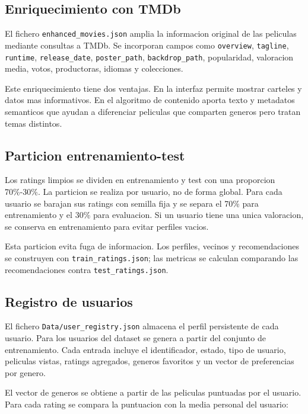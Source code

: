 \documentclass[12pt,a4paper]{article}
\begin{document}
\subsection{Enriquecimiento con TMDb}

El fichero \texttt{enhanced\_movies.json} amplia la informacion original de las peliculas mediante consultas a TMDb. Se incorporan campos como \texttt{overview}, \texttt{tagline}, \texttt{runtime}, \texttt{release\_date}, \texttt{poster\_path}, \texttt{backdrop\_path}, popularidad, valoracion media, votos, productoras, idiomas y colecciones.

Este enriquecimiento tiene dos ventajas. En la interfaz permite mostrar carteles y datos mas informativos. En el algoritmo de contenido aporta texto y metadatos semanticos que ayudan a diferenciar peliculas que comparten generos pero tratan temas distintos.

\subsection{Particion entrenamiento-test}

Los ratings limpios se dividen en entrenamiento y test con una proporcion 70\%-30\%. La particion se realiza por usuario, no de forma global. Para cada usuario se barajan sus ratings con semilla fija y se separa el 70\% para entrenamiento y el 30\% para evaluacion. Si un usuario tiene una unica valoracion, se conserva en entrenamiento para evitar perfiles vacios.

Esta particion evita fuga de informacion. Los perfiles, vecinos y recomendaciones se construyen con \texttt{train\_ratings.json}; las metricas se calculan comparando las recomendaciones contra \texttt{test\_ratings.json}.

\subsection{Registro de usuarios}

El fichero \texttt{Data/user\_registry.json} almacena el perfil persistente de cada usuario. Para los usuarios del dataset se genera a partir del conjunto de entrenamiento. Cada entrada incluye el identificador, estado, tipo de usuario, peliculas vistas, ratings agregados, generos favoritos y un vector de preferencias por genero.

El vector de generos se obtiene a partir de las peliculas puntuadas por el usuario. Para cada rating se compara la puntuacion con la media personal del usuario:
\end{document}
